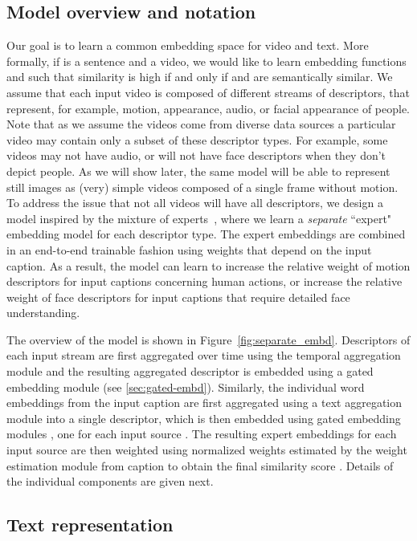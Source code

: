 \documentclass[runningheads]{llncs}
\begin{document}
\subsection{Model overview and notation}
Our goal is to learn a common embedding space for video and text.
More formally, if  is a sentence and  a video, we would like to learn embedding functions  and  such that similarity  is high if and only if  and  are semantically similar. 
We assume that each input video is composed of  different streams of descriptors,  that represent, for example, motion, appearance, audio, or facial appearance of people. Note that as we assume the videos come from diverse data sources a particular video may contain only a subset of these descriptor types. For example, some videos may not have audio, or will not have face descriptors when they don't depict people. As we will show later, the same model will be able to represent still images as (very) simple videos composed of a single frame without motion. To address the issue that not all videos will have all descriptors, we design a model inspired by the mixture of experts~\cite{jordan94mixture}, where we learn a {\em separate} ``expert" embedding model for each descriptor type. The expert embeddings are combined in an end-to-end trainable fashion using weights that depend on the input caption. As a result, the model can learn to increase the relative weight of motion descriptors for input captions concerning human actions, or increase the relative weight of face descriptors for input captions that require detailed face understanding. 


The overview of the model is shown in Figure~\ref{fig:separate_embd}. 
Descriptors of each input stream  are first aggregated over time using the temporal aggregation module  and the resulting aggregated descriptor is embedded using a gated embedding module  (see \ref{sec:gated-embd}).  Similarly, the individual word embeddings from the input caption are first aggregated using a text aggregation module into a single descriptor, which is then embedded using gated embedding modules , one for each input source . The resulting expert embeddings for each input source are then weighted using normalized weights  estimated by the weight estimation module from caption  to obtain the final similarity score . Details of the individual components are given next.



\subsection{Text representation}
\end{document}
